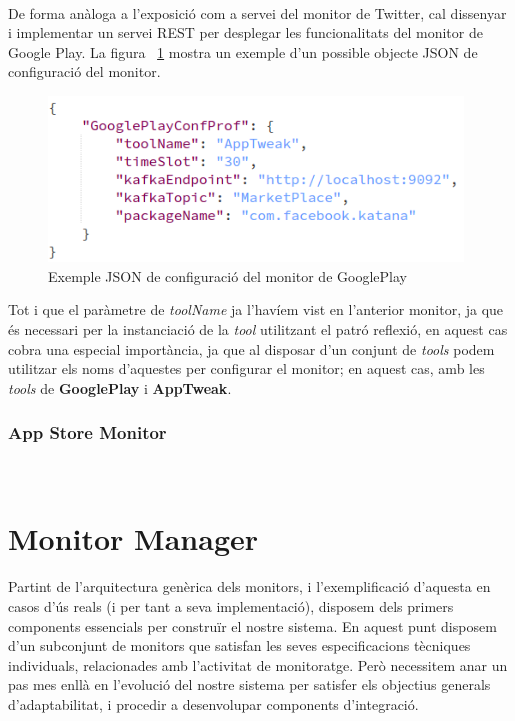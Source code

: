 \\

De forma anàloga a l'exposició com a servei del monitor de Twitter, cal dissenyar i implementar un servei REST per desplegar les funcionalitats del monitor de Google Play. La figura ~\ref{fig:Figura14} mostra un exemple d'un possible objecte JSON de configuració del monitor.\\

\begin{figure}[!h]
\centering
\includegraphics[width=11cm]{Figures/Figure14}
\decoRule
\caption[Exemple JSON de configuració del monitor de GooglePlay]{Exemple JSON de configuració del monitor de GooglePlay}
\label{fig:Figura14}
\end{figure}

Tot i que el paràmetre de \textit{toolName} ja l'havíem vist en l'anterior monitor, ja que és necessari per la instanciació de la \textit{tool} utilitzant el patró reflexió, en aquest cas cobra una especial importància, ja que al disposar d'un conjunt de \textit{tools} podem utilitzar els noms d'aquestes per configurar el monitor; en aquest cas, amb les \textit{tools} de \textbf{GooglePlay} i \textbf{AppTweak}.

\subsubsection{App Store Monitor}

\\

\section{Monitor Manager}

Partint de l'arquitectura genèrica dels monitors, i l'exemplificació d'aquesta en casos d'ús reals (i per tant a seva implementació), disposem dels primers components essencials per construïr el nostre sistema. En aquest punt disposem d'un subconjunt de monitors que satisfan les seves especificacions tècniques individuals, relacionades amb l'activitat de monitoratge. Però necessitem anar un pas mes enllà en l'evolució del nostre sistema per satisfer els objectius generals d'adaptabilitat, i procedir a desenvolupar components d'integració.\\

